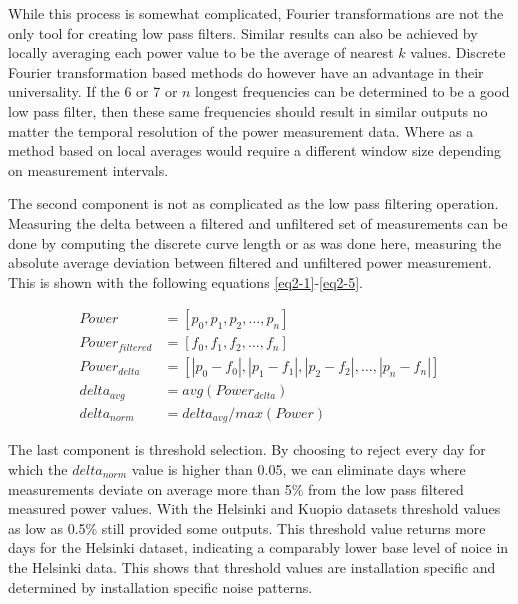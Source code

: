 
While this process is somewhat complicated, Fourier transformations are not the only tool for creating low pass filters. Similar results can also be achieved by locally averaging each power value to be the average of nearest $k$ values. Discrete Fourier transformation based methods do however have an advantage in their universality. If the 6 or 7 or $n$ longest frequencies can be determined to be a good low pass filter, then these same frequencies should result in similar outputs no matter the temporal resolution of the power measurement data. Where as a method based on local averages would require a different window size depending on measurement intervals.

The second component is not as complicated as the low pass filtering operation. Measuring the delta between a filtered and unfiltered set of measurements can be done by computing the discrete curve length or as was done here, measuring the absolute average deviation between filtered and unfiltered power measurement. This is shown with the following equations \ref{eq2-1}-\ref{eq2-5}.


\begin{align}
Power &= [p_0, p_1, p_2, \dots , p_n]   \label{eq2-1}\\ 
Power_{filtered} &= [f_0, f_1, f_2, \dots , f_n] \\
Power_{delta} &= [|p_0 - f_0|, |p_1-f_1|, |p_2-f_2|, \dots , |p_n-f_n|] \\
delta_{avg} &= avg(Power_{delta}) \\
delta_{norm} &= delta_{avg}/ max(Power) \label{eq2-5}
\end{align}


The last component is threshold selection. By choosing to reject every day for which the $delta_{norm}$ value is higher than 0.05, we can eliminate days where measurements deviate on average more than 5\% from the low pass filtered measured power values. With the Helsinki and Kuopio datasets threshold values as low as 0.5\% still provided some outputs. This threshold value returns more days for the Helsinki dataset, indicating a comparably lower base level of noice in the Helsinki data. This shows that threshold values are installation specific and determined by installation specific noise patterns.


